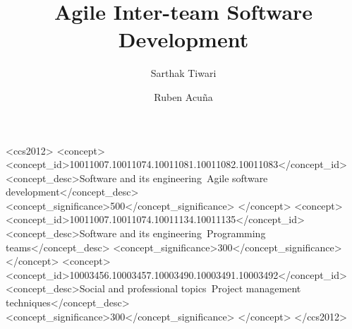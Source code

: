 \documentclass[sigplan,screen]{acmart}
\begin{document}
%
\title{Agile Inter-team Software Development}

%


\author{Sarthak Tiwari}

\author{Ruben Acu{\~n}a}



%
\renewcommand{\shortauthors}{Tiwari and Acu{\~n}a}

\renewcommand\footnotetextcopyrightpermission[1]{} %

%
\begin{abstract}



\end{abstract}

%
%
\begin{CCSXML}
<ccs2012>
<concept>
<concept_id>10011007.10011074.10011081.10011082.10011083</concept_id>
<concept_desc>Software and its engineering~Agile software development</concept_desc>
<concept_significance>500</concept_significance>
</concept>
<concept>
<concept_id>10011007.10011074.10011134.10011135</concept_id>
<concept_desc>Software and its engineering~Programming teams</concept_desc>
<concept_significance>300</concept_significance>
</concept>
<concept>
<concept_id>10003456.10003457.10003490.10003491.10003492</concept_id>
<concept_desc>Social and professional topics~Project management techniques</concept_desc>
<concept_significance>300</concept_significance>
</concept>
</ccs2012>
\end{CCSXML}
\end{document}
